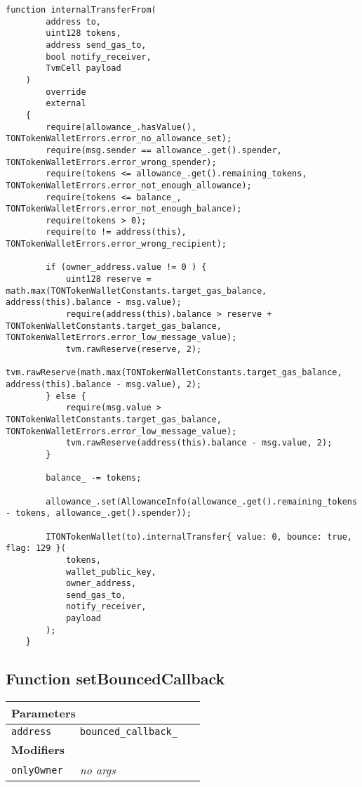 \vspace{2cm}

\begin{lstlisting}[firstnumber=423]
    function internalTransferFrom(
        address to,
        uint128 tokens,
        address send_gas_to,
        bool notify_receiver,
        TvmCell payload
    )
        override
        external
    {
        require(allowance_.hasValue(), TONTokenWalletErrors.error_no_allowance_set);
        require(msg.sender == allowance_.get().spender, TONTokenWalletErrors.error_wrong_spender);
        require(tokens <= allowance_.get().remaining_tokens, TONTokenWalletErrors.error_not_enough_allowance);
        require(tokens <= balance_, TONTokenWalletErrors.error_not_enough_balance);
        require(tokens > 0);
        require(to != address(this), TONTokenWalletErrors.error_wrong_recipient);

        if (owner_address.value != 0 ) {
            uint128 reserve = math.max(TONTokenWalletConstants.target_gas_balance, address(this).balance - msg.value);
            require(address(this).balance > reserve + TONTokenWalletConstants.target_gas_balance, TONTokenWalletErrors.error_low_message_value);
            tvm.rawReserve(reserve, 2);
            tvm.rawReserve(math.max(TONTokenWalletConstants.target_gas_balance, address(this).balance - msg.value), 2);
        } else {
            require(msg.value > TONTokenWalletConstants.target_gas_balance, TONTokenWalletErrors.error_low_message_value);
            tvm.rawReserve(address(this).balance - msg.value, 2);
        }

        balance_ -= tokens;

        allowance_.set(AllowanceInfo(allowance_.get().remaining_tokens - tokens, allowance_.get().spender));

        ITONTokenWallet(to).internalTransfer{ value: 0, bounce: true, flag: 129 }(
            tokens,
            wallet_public_key,
            owner_address,
            send_gas_to,
            notify_receiver,
            payload
        );
    }
\end{lstlisting}

\subsection{Function setBouncedCallback}


\ifsoltables
\noindent\begin{tabular}{|l|l|p{5cm}|}\hline
\multicolumn{3}{|l|}{\bf Parameters}\\\hline
\tt address & \tt bounced\_{}callback\_{} &\\\hline
\multicolumn{3}{|l|}{\bf Modifiers}\\\hline
\tt onlyOwner & {\em no args} &\\\hline
\end{tabular}
\fi

